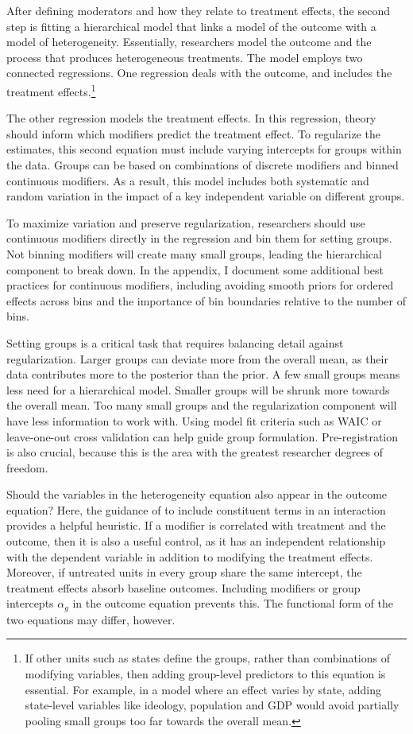 \documentclass[12pt]{article}
\begin{document}
After defining moderators and how they relate to treatment effects, the second step is fitting a hierarchical model that links a model of the outcome with a model of heterogeneity.
Essentially, researchers model the outcome and the process that produces heterogeneous treatments. 
The model employs two connected regressions.
One regression deals with the outcome, and includes the treatment effects.\footnote{If other units such as states define the groups, rather than combinations of modifying variables, then adding group-level predictors to this equation is essential. For example, in a model where an effect varies by state, adding state-level variables like ideology, population and GDP would avoid partially pooling small groups too far towards the overall mean.}


The other regression models the treatment effects.
In this regression, theory should inform which modifiers predict the treatment effect. 
To regularize the estimates, this second equation must include varying intercepts for groups within the data. 
Groups can be based on combinations of discrete modifiers and binned continuous modifiers.
As a result, this model includes both systematic and random variation in the impact of a key independent variable on different groups.

 
To maximize variation and preserve regularization, researchers should use continuous modifiers directly in the regression and bin them for setting groups. 
Not binning modifiers will create many small groups, leading the hierarchical component to break down.
In the appendix, I document some additional best practices for continuous modifiers, including avoiding smooth priors for ordered effects across bins and the importance of bin boundaries relative to the number of bins. 


Setting groups is a critical task that requires balancing detail against regularization.
Larger groups can deviate more from the overall mean, as their data contributes more to the posterior than the prior.
A few small groups means less need for a hierarchical model.
Smaller groups will be shrunk more towards the overall mean.
Too many small groups and the regularization component will have less information to work with. 
Using model fit criteria such as WAIC or leave-one-out cross validation can help guide group formulation.
Pre-registration is also crucial, because this is the area with the greatest researcher degrees of freedom.


Should the variables in the heterogeneity equation also appear in the outcome equation? 
Here, the guidance of \citet{BramborClarkGolder2006} to include constituent terms in an interaction provides a helpful heuristic. 
If a modifier is correlated with treatment and the outcome, then it is also a useful control, as it has an independent relationship with the dependent variable in addition to modifying the treatment effects.
Moreover, if untreated units in every group share the same intercept, the treatment effects absorb baseline outcomes.
Including modifiers or group intercepts $\alpha_g$ in the outcome equation prevents this.
The functional form of the two equations may differ, however.
\end{document}
